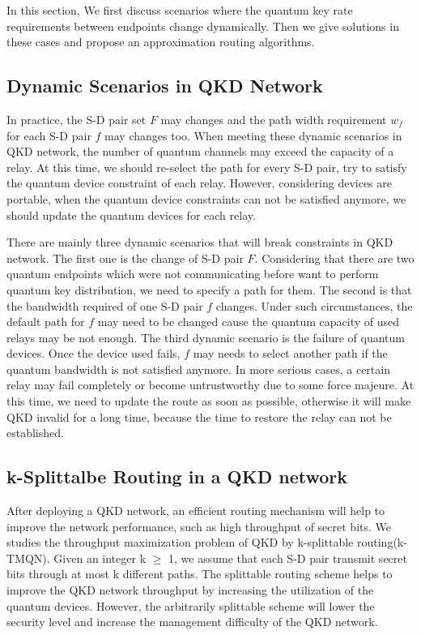 In this section, We first discuss scenarios where the quantum key rate requirements between endpoints change dynamically. Then we give solutions in these cases and propose an approximation routing algorithms.
\subsection{Dynamic Scenarios in QKD Network}
In practice, the S-D pair set $F$ may changes and the path width requirement $w_f$ for each S-D pair $f$ may changes too. When meeting these dynamic scenarios in QKD network, the number of quantum channels may exceed the capacity of a relay. At this time, we should re-select the path for every S-D pair, try to satisfy the quantum device constraint of each relay. However, considering devices are portable, when the quantum device constraints can not be satisfied anymore, we should update the quantum devices for each relay.


There are mainly three dynamic scenarios that will break constraints in QKD network. The first one is the change of S-D pair $F$. Considering that there are two quantum endpoints which were not communicating before want to perform quantum key distribution, we need to specify a path for them. The second is that the bandwidth required of one S-D pair $f$ changes. Under such circumstances, the default path for $f$ may need to be changed cause the quantum capacity of used relays may be not enough. The third dynamic scenario is the failure of quantum devices. Once the device used fails, $f$ may needs to select another path if the quantum bandwidth is not satisfied anymore. In more serious cases, a certain relay may fail completely or become untrustworthy due to some force majeure. At this time, we need to update the route as soon as possible, otherwise it will make QKD invalid for a long time, because the time to restore the relay can not be established.


\subsection{k-Splittalbe Routing in a QKD network}
After deploying a QKD network, an efficient routing mechanism will help to improve the network performance, such as high throughput of secret bits. We studies the throughput maximization problem of QKD by k-splittable routing(k-TMQN). Given an integer k $\ge$ 1, we assume that each S-D pair transmit secret bits through at most k different paths. The splittable routing scheme helps to improve the QKD network throughput by increasing the utilization of the quantum devices. However, the arbitrarily splittable scheme will lower the security level and increase the management difficulty of the QKD network. 

